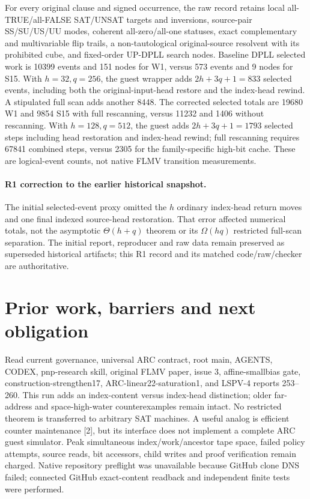 \documentclass[11pt]{article}
\begin{document}
For every original clause and signed occurrence, the raw record retains local all-TRUE/all-FALSE SAT/UNSAT targets and inversions, source-pair SS/SU/US/UU modes, coherent all-zero/all-one statuses, exact complementary and multivariable flip trails, a non-tautological original-source resolvent with its prohibited cube, and fixed-order UP-DPLL search nodes. Baseline DPLL selected work is 10399 events and 151 nodes for W1, versus 573 events and 9 nodes for S15. With $h=32,q=256$, the guest wrapper adds $2h+3q+1=833$ selected events, including both the original-input-head restore and the index-head rewind. A stipulated full scan adds another 8448. The corrected selected totals are 19680 W1 and 9854 S15 with full rescanning, versus 11232 and 1406 without rescanning. With $h=128,q=512$, the guest adds $2h+3q+1=1793$ selected steps including head restoration and index-head rewind; full rescanning requires 67841 combined steps, versus 2305 for the family-specific high-bit cache. These are logical-event counts, not native FLMV transition measurements.

\paragraph{R1 correction to the earlier historical snapshot.} The initial selected-event proxy omitted the $h$ ordinary index-head return moves and one final indexed source-head restoration. That error affected numerical totals, not the asymptotic $\Theta(h+q)$ theorem or its $\Omega(hq)$ restricted full-scan separation. The initial report, reproducer and raw data remain preserved as superseded historical artifacts; this R1 record and its matched code/raw/checker are authoritative.

\section*{Prior work, barriers and next obligation}
Read current governance, universal ARC contract, root main, AGENTS, CODEX, pnp-research skill, original FLMV paper, issue 3, affine-smallbias gate, construction-strengthen17, ARC-linear22-saturation1, and LSPV-4 reports 253--260. This run adds an index-content versus index-head distinction; older far-address and space-high-water counterexamples remain intact. No restricted theorem is transferred to arbitrary SAT machines. A useful analog is efficient counter maintenance [2], but its interface does not implement a complete ARC guest simulator. Peak simultaneous index/work/ancestor tape space, failed policy attempts, source reads, bit accessors, child writes and proof verification remain charged. Native repository preflight was unavailable because GitHub clone DNS failed; connected GitHub exact-content readback and independent finite tests were performed.
\end{document}
